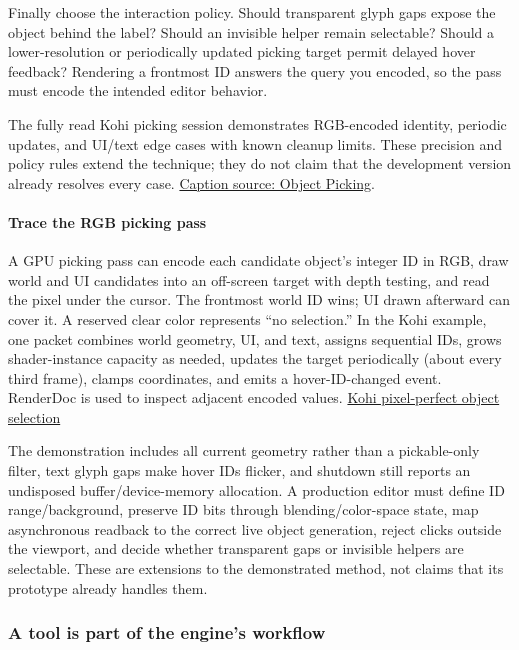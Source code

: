 Finally choose the interaction policy. Should transparent glyph gaps expose the object behind the label? Should an invisible helper remain selectable? Should a lower-resolution or periodically updated picking target permit delayed hover feedback? Rendering a frontmost ID answers the query you encoded, so the pass must encode the intended editor behavior.

The fully read Kohi picking session demonstrates RGB-encoded identity, periodic updates, and UI/text edge cases with known cleanup limits. These precision and policy rules extend the technique; they do not claim that the development version already resolves every case. \href{https://www.youtube.com/watch?v=mx1TyxNFrdo}{Caption source: Object Picking}.

\paragraph{Trace the RGB picking pass}\label{06-engine-ii-ch032-trace-the-rgb-picking-pass}

A GPU picking pass can encode each candidate object's integer ID in RGB, draw world and UI candidates into an off-screen target with depth testing, and read the pixel under the cursor. The frontmost world ID wins; UI drawn afterward can cover it. A reserved clear color represents ``no selection.'' In the Kohi example, one packet combines world geometry, UI, and text, assigns sequential IDs, grows shader-instance capacity as needed, updates the target periodically (about every third frame), clamps coordinates, and emits a hover-ID-changed event. RenderDoc is used to inspect adjacent encoded values. \href{https://www.youtube.com/watch?v=mx1TyxNFrdo}{Kohi pixel-perfect object selection}

The demonstration includes all current geometry rather than a pickable-only filter, text glyph gaps make hover IDs flicker, and shutdown still reports an undisposed buffer/device-memory allocation. A production editor must define ID range/background, preserve ID bits through blending/color-space state, map asynchronous readback to the correct live object generation, reject clicks outside the viewport, and decide whether transparent gaps or invisible helpers are selectable. These are extensions to the demonstrated method, not claims that its prototype already handles them.

\subsubsection{A tool is part of the engine's workflow}\label{06-engine-ii-ch032-a-tool-is-part-of-the-engines-workflow}

